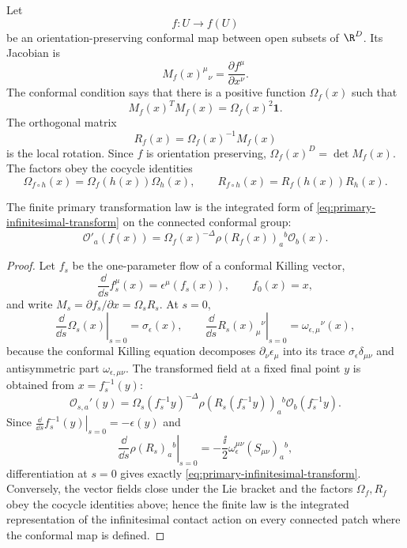 \begin{definition}
\label{def:conformal-factor-local-rotation}
Let
\[
  f:U\longrightarrow f(U)
\]
be an orientation-preserving conformal map between open subsets of
\(\R^D\).  Its Jacobian is
\[
  M_f(x)^\mu{}_\nu=\frac{\partial f^\mu}{\partial x^\nu}.
\]
The conformal condition says that there is a positive function
\(\Omega_f(x)\) such that
\begin{equation}
  M_f(x)^T M_f(x)=\Omega_f(x)^2\mathbf 1 .
  \label{eq:jacobian-scale-rotation-factorization}
\end{equation}
The orthogonal matrix
\[
  R_f(x)=\Omega_f(x)^{-1}M_f(x)
\]
is the local rotation.  Since \(f\) is orientation preserving,
\(\Omega_f(x)^D=\det M_f(x)\).  The factors obey the cocycle identities
\[
  \Omega_{f\circ h}(x)=\Omega_f(h(x))\Omega_h(x),
  \qquad
  R_{f\circ h}(x)=R_f(h(x))R_h(x).
\]
\end{definition}

\begin{theorem}
\label{thm:finite-primary-transformation-law}
The finite primary transformation law is the integrated form of
\eqref{eq:primary-infinitesimal-transform} on the connected conformal group:
\begin{equation}
  \mathcal O'_a(f(x))
  =
  \Omega_f(x)^{-\Delta}
  \rho(R_f(x))_a{}^b\mathcal O_b(x).
  \label{eq:finite-primary-transform}
\end{equation}
\end{theorem}

\begin{proof}
Let \(f_s\) be the one-parameter flow of a
conformal Killing vector,
\[
  \frac{\dd}{\dd s}f_s^\mu(x)=\epsilon^\mu(f_s(x)),
  \qquad
  f_0(x)=x,
\]
and write \(M_s=\partial f_s/\partial x=\Omega_s R_s\).  At \(s=0\),
\begin{equation}
  \left.\frac{\dd}{\dd s}\Omega_s(x)\right|_{s=0}
  =
  \sigma_\epsilon(x),
  \qquad
  \left.\frac{\dd}{\dd s}R_s(x)_\mu{}^\nu\right|_{s=0}
  =
  \omega_{\epsilon,\mu}{}^\nu(x),
  \label{eq:primary-finite-infinitesimal-jacobian}
\end{equation}
because the conformal Killing equation decomposes
\(\partial_\nu\epsilon_\mu\) into its trace
\(\sigma_\epsilon\delta_{\mu\nu}\) and antisymmetric part
\(\omega_{\epsilon,\mu\nu}\).  The transformed field at a fixed final point
\(y\) is obtained from \(x=f_s^{-1}(y)\):
\[
  \mathcal O_{s,a}'(y)
  =
  \Omega_s(f_s^{-1}y)^{-\Delta}
  \rho(R_s(f_s^{-1}y))_a{}^b
  \mathcal O_b(f_s^{-1}y).
\]
Since \(\left.\frac{\dd}{\dd s}f_s^{-1}(y)\right|_{s=0}
=-\epsilon(y)\) and
\[
  \left.\frac{\dd}{\dd s}\rho(R_s)_a{}^b\right|_{s=0}
  =
  -\frac{\ii}{2}\omega_\epsilon^{\mu\nu}
  (S_{\mu\nu})_a{}^b ,
\]
differentiation at \(s=0\) gives exactly
\eqref{eq:primary-infinitesimal-transform}.  Conversely, the vector fields
close under the Lie bracket and the factors \(\Omega_f,R_f\) obey the cocycle
identities above; hence the finite law is the integrated representation of the
infinitesimal contact action on every connected patch where the conformal map
is defined.
\end{proof}

